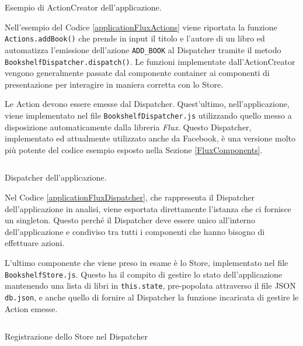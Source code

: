 \begin{listing}[ht]
\inputminted{jsx}{sources/applicationFluxActions.js}
\caption{Esempio di ActionCreator dell'applicazione.} 
\label{applicationFluxActions} 
\end{listing} 

Nell'esempio del Codice \ref{applicationFluxActions} viene riportata la funzione \texttt{Actions.addBook()} che prende in input il titolo e l'autore di un libro ed automatizza l'emissione dell'azione \texttt{ADD_BOOK} al Dispatcher tramite il metodo \texttt{BookshelfDispatcher.dispatch()}.
Le funzioni implementate dall'ActionCreator vengono generalmente passate dal componente container  ai componenti di presentazione per interagire in maniera corretta con lo Store.

Le Action devono essere emesse dal Dispatcher. Quest'ultimo, nell'applicazione, viene implementato nel file \texttt{BookshelfDispatcher.js} utilizzando quello messo a disposizione automaticamente dalla libreria \textit{Flux}. Questo Dispatcher, implementato ed attualmente utilizzato anche da Facebook, è una versione molto più potente del codice esempio esposto nella Sezione \ref{FluxComponents}.

\begin{listing}[ht]
\inputminted{jsx}{sources/applicationFluxDispatcher.js}
\caption{Dispatcher dell'applicazione.} 
\label{applicationFluxDispatcher} 
\end{listing} 

Nel Codice \ref{applicationFluxDispatcher}, che rappresenta il Dispatcher dell'applicazione in analisi, viene esportata direttamente l'istanza che ci fornisce un singleton. Questo perché il Dispatcher deve essere unico all'interno dell'applicazione e condiviso tra tutti i componenti che hanno bisogno di effettuare azioni.

L'ultimo componente che viene preso in esame è lo Store, implementato nel file \texttt{BookshelfStore.js}. Questo ha il compito di gestire lo stato dell'applicazione mantenendo una lista di libri in \texttt{this.state}, pre-popolata attraverso il file JSON \texttt{db.json}, e anche quello di fornire al Dispatcher la funzione incaricata di gestire le Action emesse.

\begin{listing}[ht]
\inputminted{jsx}{sources/applicationFluxStore.js}
\caption{Registrazione dello Store nel Dispatcher} 
\label{applicationFluxStore} 
\end{listing}

